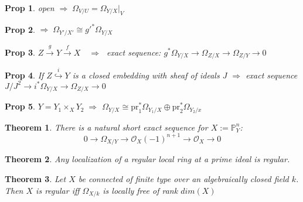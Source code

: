 \documentclass[a4paper, 12pt]{article}
\newcommand{\ox}{\mathcal{O}_X}
\newtheorem*{prop}{Prop}
\newtheorem*{thm}{Theorem}
\begin{document}
	\begin{prop}
		 open $ \Rightarrow \; \Omega_{V/U} = \Omega_{Y/X}|_{V} $
	\end{prop}
	
	\begin{prop}
			$ \Rightarrow \; \Omega_{Y'/X'} \cong g'^*\Omega_{Y/X} $
	\end{prop}
		
	\begin{prop}
		$ Z \xrightarrow{g} Y \xrightarrow{f} X  \quad \Rightarrow \; $ exact sequence:	 $ g^* \Omega_{Y/X} \rightarrow \Omega_{Z/X} \rightarrow \Omega_{Z/Y} \rightarrow 0 $	
	\end{prop}
			
	\begin{prop}
		If $ Z \overset{i}{\hookrightarrow} Y $ is a closed embedding with  sheaf of ideals $ J $ $ \Rightarrow $ exact sequence $ J/J^2 \rightarrow i^* \Omega_{Y/X} \rightarrow \Omega_{Z/X} \rightarrow 0 $
	\end{prop}
				
	\begin{prop}
		$ Y = Y_1 \times_X Y_2 \; \Rightarrow $ $ \Omega_{Y/X} \cong \mathrm{pr}_1^* \Omega_{Y_1/X} \oplus \mathrm{pr}_2^* \Omega_{Y_2/ x} $
	\end{prop}
					
	\begin{thm}
		There is a natural short exact sequence for $ X:= \mathbb{P}^n_Y $:
		\[ 0 \rightarrow \Omega_{X/Y} \rightarrow \ox(-1)^{n+1} \rightarrow \ox \rightarrow 0 \]
	\end{thm}
		
	\begin{thm}
		Any localization of  a regular local ring at a prime ideal is regular.
	\end{thm}
	
	\begin{thm}
		Let $ X $ be connected of finite type over an algebraically closed field $ k $. Then $ X $ is regular iff $ \Omega_{X/k } $  is locally free of rank $ dim(X) $
	\end{thm}
	
\end{document}
